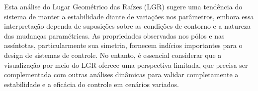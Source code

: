 Esta análise do Lugar Geométrico das Raízes (LGR) sugere uma tendência do sistema de manter a estabilidade diante de variações nos parâmetros, embora essa interpretação dependa de suposições sobre as condições de contorno e a natureza das mudanças paramétricas. As propriedades observadas nos pólos e nas assíntotas, particularmente sua simetria, fornecem indícios importantes para o design de sistemas de controle. No entanto, é essencial considerar que a visualização por meio do LGR oferece uma perspectiva limitada, que precisa ser complementada com outras análises dinâmicas para validar completamente a estabilidade e a eficácia do controle em cenários variados.

